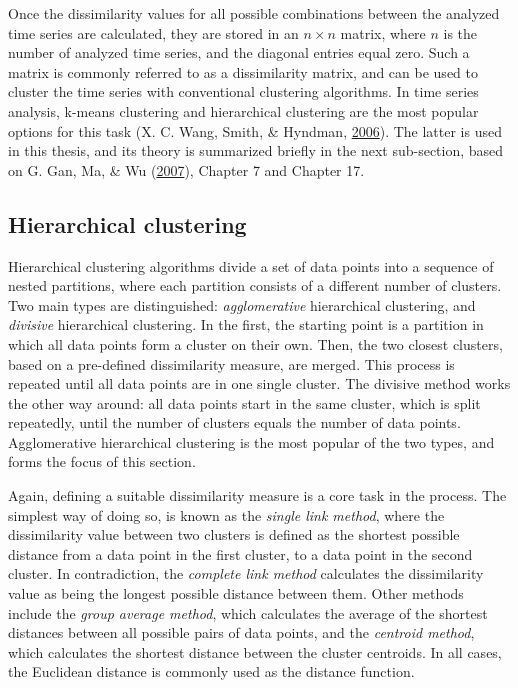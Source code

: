 \documentclass[12pt,oneside]{reedthesis}
\begin{document}
Once the dissimilarity values for all possible combinations between the
analyzed time series are calculated, they are stored in an
\(n \times n\) matrix, where \(n\) is the number of analyzed time
series, and the diagonal entries equal zero. Such a matrix is commonly
referred to as a dissimilarity matrix, and can be used to cluster the
time series with conventional clustering algorithms. In time series
analysis, k-means clustering and hierarchical clustering are the most
popular options for this task (X. C. Wang, Smith, \& Hyndman,
\protect\hyperlink{ref-wang2006}{2006}). The latter is used in this
thesis, and its theory is summarized briefly in the next sub-section,
based on G. Gan, Ma, \& Wu (\protect\hyperlink{ref-gan2007}{2007}),
Chapter 7 and Chapter 17.

\subsection{Hierarchical clustering}\label{hierarchical-clustering}

Hierarchical clustering algorithms divide a set of data points into a
sequence of nested partitions, where each partition consists of a
different number of clusters. Two main types are distinguished:
\emph{agglomerative} hierarchical clustering, and \emph{divisive}
hierarchical clustering. In the first, the starting point is a partition
in which all data points form a cluster on their own. Then, the two
closest clusters, based on a pre-defined dissimilarity measure, are
merged. This process is repeated until all data points are in one single
cluster. The divisive method works the other way around: all data points
start in the same cluster, which is split repeatedly, until the number
of clusters equals the number of data points. Agglomerative hierarchical
clustering is the most popular of the two types, and forms the focus of
this section.

Again, defining a suitable dissimilarity measure is a core task in the
process. The simplest way of doing so, is known as the \emph{single link
method}, where the dissimilarity value between two clusters is defined
as the shortest possible distance from a data point in the first
cluster, to a data point in the second cluster. In contradiction, the
\emph{complete link method} calculates the dissimilarity value as being
the longest possible distance between them. Other methods include the
\emph{group average method}, which calculates the average of the
shortest distances between all possible pairs of data points, and the
\emph{centroid method}, which calculates the shortest distance between
the cluster centroids. In all cases, the Euclidean distance is commonly
used as the distance function.
\end{document}
